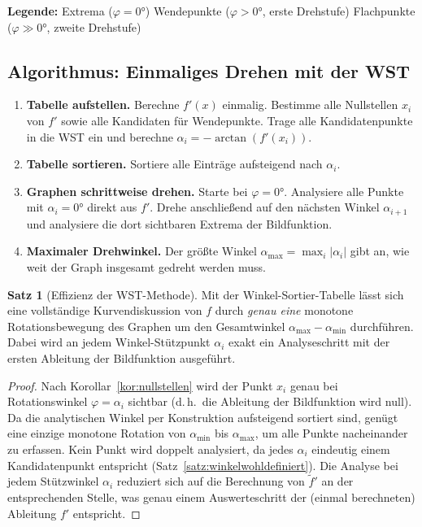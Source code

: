 ﻿\documentclass[12pt, a4paper]{article}
\theoremstyle{definition}
\newtheorem{satz}{Satz}[section]
\begin{document}
	\medskip
	\noindent\textbf{Legende:}
	\quad\colorbox{tabblue}{\phantom{X}} Extrema ($\varphi = 0 °$)
	\quad\colorbox{tabgreen}{\phantom{X}} Wendepunkte ($\varphi > 0 °$, erste Drehstufe)
	\quad\colorbox{taborange}{\phantom{X}} Flachpunkte ($\varphi \gg 0 °$, zweite Drehstufe)
	
	\subsection{Algorithmus: Einmaliges Drehen mit der WST}
	
	\begin{enumerate}[label=\textbf{Phase \arabic*:}, leftmargin=*, itemsep=6pt]
		\item \textbf{Tabelle aufstellen.}
		Berechne $f'(x)$ einmalig. Bestimme alle Nullstellen $x_i$ von $f'$
		sowie alle Kandidaten für Wendepunkte. Trage alle Kandidatenpunkte
		in die WST ein und berechne
		$\alpha_i = -\arctan(f'(x_i))$.
		
		\item \textbf{Tabelle sortieren.}
		Sortiere alle Einträge aufsteigend nach $\alpha_i$.
		
		\item \textbf{Graphen schrittweise drehen.}
		Starte bei $\varphi = 0 °$. Analysiere alle Punkte mit $\alpha_i = 0 °$
		direkt aus $f'$. Drehe anschließend auf den nächsten Winkel $\alpha_{i+1}$
		und analysiere die dort sichtbaren Extrema der Bildfunktion.
		
		\item \textbf{Maximaler Drehwinkel.}
		Der größte Winkel $\alpha_{\max} = \max_i |\alpha_i|$ gibt an, wie weit
		der Graph insgesamt gedreht werden muss.
	\end{enumerate}
	
	\begin{satz}[Effizienz der WST-Methode]\label{satz:wst}
		Mit der Winkel-Sortier-Tabelle lässt sich eine vollständige Kurvendiskussion
		von $f$ durch \emph{genau eine} monotone Rotationsbewegung des Graphen
		um den Gesamtwinkel $\alpha_{\max} - \alpha_{\min}$ durchführen. Dabei wird
		an jedem Winkel-Stützpunkt $\alpha_i$ exakt ein Analyseschritt mit der
		ersten Ableitung der Bildfunktion ausgeführt.
	\end{satz}
	
	\begin{proof}
		Nach Korollar~\ref{kor:nullstellen} wird der Punkt $x_i$ genau bei
		Rotationswinkel $\varphi = \alpha_i$ sichtbar (d.\,h.\ die Ableitung der
		Bildfunktion wird null). Da die analytischen Winkel per Konstruktion
		aufsteigend sortiert sind, genügt eine einzige monotone Rotation von
		$\alpha_{\min}$ bis $\alpha_{\max}$, um alle Punkte nacheinander zu erfassen.
		Kein Punkt wird doppelt analysiert, da jedes $\alpha_i$ eindeutig einem
		Kandidatenpunkt entspricht (Satz~\ref{satz:winkelwohldefiniert}).
		Die Analyse bei jedem Stützwinkel $\alpha_i$ reduziert sich auf die
		Berechnung von $\tilde{f}'$ an der entsprechenden Stelle, was genau einem
		Auswerteschritt der (einmal berechneten) Ableitung $f'$ entspricht.
	\end{proof}
	
\end{document}
